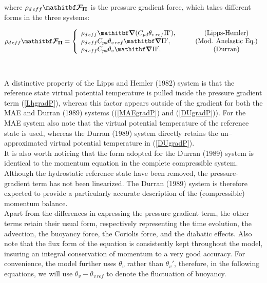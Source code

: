 where $\rho_{d\,eff} \vec{{\cal F}_{\Pi}}$ is the pressure gradient force, which
takes different forms in the three systems:

%
\parbox{15cm}{
\begin{displaymath}
\rho_{d\,eff} \vec{{\cal F}_{\Pi}} =  \left\{
\begin{array}{l@{\quad}cc}
\rho_{d\,eff}  \vec{ \nabla}(C_{pd} \theta_{v\,ref} \Pi '),
                                        & \quad &\mbox{(Lipps-Hemler)}\\
\rho_{d\,eff} C_{pd} \theta_{v\,ref} \vec{ \nabla} \Pi ',
                                                & \quad &\mbox{(Mod. Anelastic  Eq.)} \\
\rho_{d\,eff} C_{pd} \theta_{v} \vec{ \nabla} \Pi '. & \quad  &\mbox{(Durran)}
\end{array}
\right.
\end{displaymath}
}
\hfill
\parbox{1cm}{
\begin{eqnarray}
\ \label{LhgradP} \\ \label{MAEgradP}   \\ \label{DUgradP}
\end{eqnarray}
}
%

A distinctive property of the Lipps and Hemler (1982) system is that the reference state virtual
potential temperature is pulled inside the pressure gradient term (\ref{LhgradP}), whereas
this factor appears outside of the gradient for both the MAE and Durran (1989) systems
((\ref{MAEgradP}) and (\ref{DUgradP})). For the MAE system also note that the virtual potential
temperature of the reference state is used, whereas the Durran (1989) system directly
retains the un--approximated virtual potential temperature in (\ref{DUgradP}).\\

It is also worth noticing that
the form adopted for the Durran (1989) system is identical to the momentum equation in the
complete compressible system. Although the hydrostatic reference state have been removed,
the pressure-gradient term has not been linearized. The Durran (1989) system is therefore
expected to provide a particularly accurate description of the (compressible) momentum
balance.\\

Apart from the differences in expressing the pressure gradient term, the other terms
retain their usual form, respectively representing the time evolution, the advection,
the buoyancy force, the Coriolis force, and the diabatic effects. Also note that the flux
form of the equation is  consistently kept throughout the model, insuring an integral
conservation of momentum to a very good
accuracy. For convenience, the model further uses $\theta_v$ rather than $\theta_v '$,
therefore, in the following equations, we will use $\theta_v-\theta_{v\,ref}$ to denote
the fluctuation of buoyancy.\\

